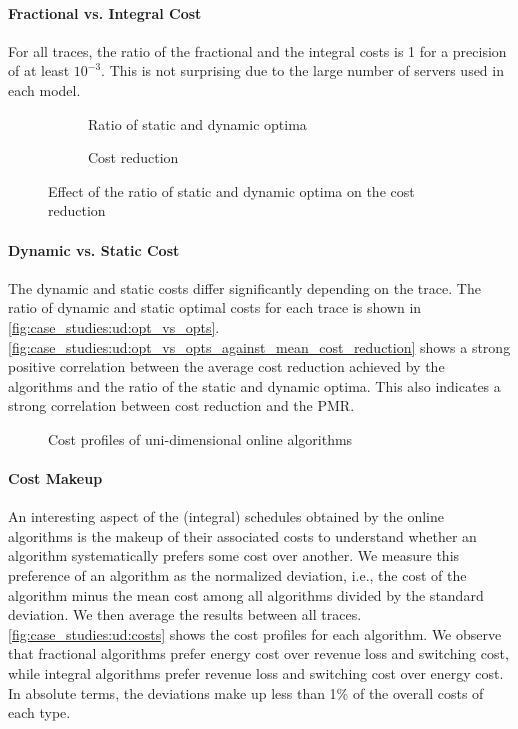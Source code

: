\paragraph{Fractional vs. Integral Cost} For all traces, the ratio of the fractional and the integral costs is 1 for a precision of at least $10^{-3}$. This is not surprising due to the large number of servers used in each model.

\begin{figure}
    \begin{subfigure}[b]{.5\linewidth}
    \resizebox{\textwidth}{!}{}
    \caption{Ratio of static and dynamic optima}\label{fig:case_studies:ud:opt_vs_opts}
    \end{subfigure}
    \begin{subfigure}[b]{.5\linewidth}
    \resizebox{\textwidth}{!}{}
    \caption{Cost reduction}\label{fig:case_studies:ud:opt_vs_opts_against_mean_cost_reduction}
    \end{subfigure}
    \caption{Effect of the ratio of static and dynamic optima on the cost reduction}
\end{figure}

\paragraph{Dynamic vs. Static Cost} The dynamic and static costs differ significantly depending on the trace. The ratio of dynamic and static optimal costs for each trace is shown in \autoref{fig:case_studies:ud:opt_vs_opts}. \autoref{fig:case_studies:ud:opt_vs_opts_against_mean_cost_reduction} shows a strong positive correlation between the average cost reduction achieved by the algorithms and the ratio of the static and dynamic optima. This also indicates a strong correlation between cost reduction and the PMR.

\begin{figure}
    \centering
    
    \caption{Cost profiles of uni-dimensional online algorithms}\label{fig:case_studies:ud:costs}
\end{figure}

\paragraph{Cost Makeup} An interesting aspect of the (integral) schedules obtained by the online algorithms is the makeup of their associated costs to understand whether an algorithm systematically prefers some cost over another. We measure this preference of an algorithm as the normalized deviation, i.e., the cost of the algorithm minus the mean cost among all algorithms divided by the standard deviation. We then average the results between all traces. \autoref{fig:case_studies:ud:costs} shows the cost profiles for each algorithm. We observe that fractional algorithms prefer energy cost over revenue loss and switching cost, while integral algorithms prefer revenue loss and switching cost over energy cost. In absolute terms, the deviations make up less than 1\% of the overall costs of each type.


